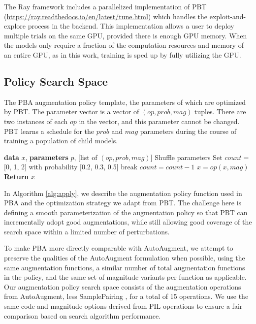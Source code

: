 \documentclass{article}
\begin{document}
The Ray framework \cite{ray} includes a parallelized implementation of PBT (\url{https://ray.readthedocs.io/en/latest/tune.html}) which handles the exploit-and-explore process in the backend. This implementation allows a user to deploy multiple trials on the same GPU, provided there is enough GPU memory. When the models only require a fraction of the computation resources and memory of an entire GPU, as in this work, training is sped up by fully utilizing the GPU.

\subsection{Policy Search Space}

\begin{algorithm}[tb]
  \caption{The PBA augmentation policy template, the parameters of which are optimized by PBT. The parameter vector is a vector of $(op, prob, mag)$ tuples. There are two instances of each $op$ in the vector, and this parameter cannot be changed. PBT learns a schedule for the $prob$ and $mag$ parameters during the course of training a population of child models.}
  \label{alg:apply}
\begin{algorithmic}
\vspace{.1cm}
   \textbf{data} $x$, \textbf{parameters}  $p$, [list of $(op, prob, mag)$]
  \STATE Shuffle parameters
  \STATE Set $count = $ [0, 1, 2] with probability [0.2, 0.3, 0.5]
    \STATE break
    \ENDIF
  \STATE $count = count - 1$
  \STATE $x = op(x, mag)$
  \ENDIF
  \ENDFOR
  \STATE \textbf{Return} $x$
\end{algorithmic}
\end{algorithm}

In Algorithm \ref{alg:apply}, we describe the augmentation policy function used in PBA and the optimization strategy we adapt from PBT. The challenge here is defining a smooth parameterization of the augmentation policy so that PBT can incrementally adopt good augmentations, while still allowing good coverage of the search space within a limited number of perturbations.

To make PBA more directly comparable with AutoAugment, we attempt to preserve the qualities of the AutoAugment formulation when possible, using the same augmentation functions, a similar number of total augmentation functions in the policy, and the same set of magnitude variants per function as applicable. Our augmentation policy search space consists of the augmentation operations from AutoAugment, less SamplePairing \cite{samplepairing}, for a total of 15 operations. We use the same code and magnitude options derived from PIL operations to ensure a fair comparison based on search algorithm performance. 
\end{document}
